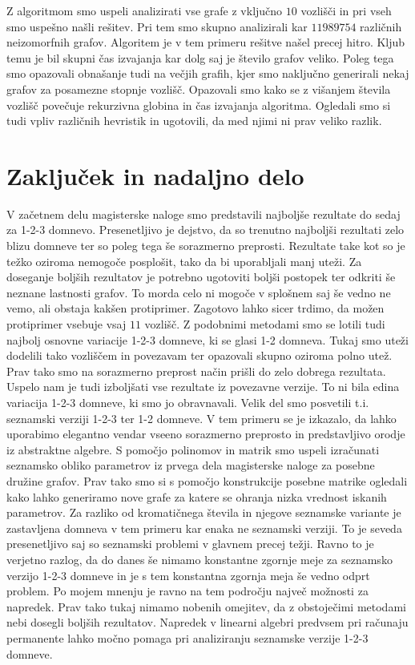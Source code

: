 \documentclass[12pt,a4paper,twoside]{article}
\theoremstyle{definition} %
\theoremstyle{plain} %
\numberwithin{equation}{section}  %
\begin{document}
Z algoritmom smo uspeli analizirati vse grafe z vključno $10$ vozlišči in pri vseh smo uspešno našli rešitev. Pri tem smo skupno analizirali kar $11989754$ različnih neizomorfnih grafov. Algoritem je v tem primeru rešitve našel precej hitro. Kljub temu je bil skupni čas izvajanja kar dolg saj je število grafov veliko. Poleg tega smo opazovali obnašanje tudi na večjih grafih, kjer smo naključno generirali nekaj grafov za posamezne stopnje vozlišč. Opazovali smo kako se z višanjem števila vozlišč povečuje rekurzivna globina in čas izvajanja algoritma. Ogledali smo si tudi vpliv različnih hevristik in ugotovili, da med njimi ni prav veliko razlik. 

\section{Zaključek in nadaljno delo}

V začetnem delu magisterske naloge smo predstavili najboljše rezultate do sedaj za 1-2-3 domnevo. Presenetljivo je dejstvo, da so trenutno najboljši rezultati zelo blizu domneve ter so poleg tega še sorazmerno preprosti. Rezultate take kot so je težko oziroma nemogoče posplošit, tako da bi uporabljali manj uteži. Za doseganje boljših rezultatov je potrebno ugotoviti boljši postopek ter odkriti še neznane lastnosti grafov. To morda celo ni mogoče v splošnem saj še vedno ne vemo, ali obstaja kakšen protiprimer. Zagotovo lahko sicer trdimo, da možen protiprimer vsebuje vsaj $11$ vozlišč. Z podobnimi metodami smo se lotili tudi najbolj osnovne variacije 1-2-3 domneve, ki se glasi 1-2 domneva. Tukaj smo uteži dodelili tako vozliščem in povezavam ter opazovali skupno oziroma polno utež. Prav tako smo na sorazmerno preprost način prišli do zelo dobrega rezultata. Uspelo nam je tudi izboljšati vse rezultate iz povezavne verzije. To ni bila edina variacija 1-2-3 domneve, ki smo jo obravnavali. Velik del smo posvetili t.i. seznamski verziji 1-2-3 ter 1-2 domneve. V tem primeru se je izkazalo, da lahko uporabimo elegantno vendar vseeno sorazmerno preprosto in predstavljivo orodje iz abstraktne algebre. S pomočjo polinomov in matrik smo uspeli izračunati seznamsko obliko parametrov iz prvega dela magisterske naloge za posebne družine grafov. Prav tako smo si s pomočjo konstrukcije posebne matrike ogledali kako lahko generiramo nove grafe za katere se ohranja nizka vrednost iskanih parametrov. Za razliko od kromatičnega števila in njegove seznamske variante je zastavljena domneva v tem primeru kar enaka ne seznamski verziji. To je seveda presenetljivo saj so seznamski problemi v glavnem precej težji. Ravno to je verjetno razlog, da do danes še nimamo konstantne zgornje meje za seznamsko verzijo 1-2-3 domneve in je s tem konstantna zgornja meja še vedno odprt problem. Po mojem mnenju je ravno na tem področju največ možnosti za napredek. Prav tako tukaj nimamo nobenih omejitev, da z obstoječimi metodami nebi dosegli boljših rezultatov. Napredek v linearni algebri predvsem pri računaju permanente lahko močno pomaga pri analiziranju seznamske verzije 1-2-3 domneve.
\end{document}
